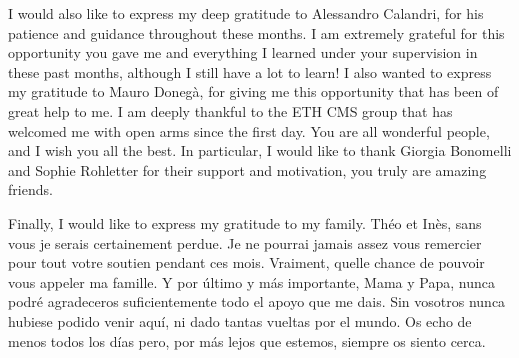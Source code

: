 \documentclass[11pt]{article}
\numberwithin{figure}{section}  %
\numberwithin{table}{section}   %
\numberwithin{equation}{section} %
\begin{document}
I would also like to express my deep gratitude to Alessandro Calandri, for his patience and guidance throughout these months. I am extremely grateful for this opportunity you gave me and everything I learned under your supervision in these past months, although I still have a lot to learn! I also wanted to express my gratitude to Mauro Donegà, for giving me this opportunity that has been of great help to me. I am deeply thankful to the ETH CMS group that has welcomed me with open arms since the first day. You are all wonderful people, and I wish you all the best. In particular, I would like to thank Giorgia Bonomelli and Sophie Rohletter for their support and motivation, you truly are amazing friends.

Finally, I would like to express my gratitude to my family. Théo et Inès, sans vous je serais certainement perdue. Je ne pourrai jamais assez vous remercier pour tout votre soutien pendant ces mois. Vraiment, quelle chance de pouvoir vous appeler ma famille. Y por último y más importante, Mama y Papa, nunca podré agradeceros suficientemente todo el apoyo que me dais. Sin vosotros nunca hubiese podido venir aquí, ni dado tantas vueltas por el mundo. Os echo de menos todos los días pero, por más lejos que estemos, siempre os siento cerca. 



% 
% 

\newpage

\printbibliography
\end{document}
